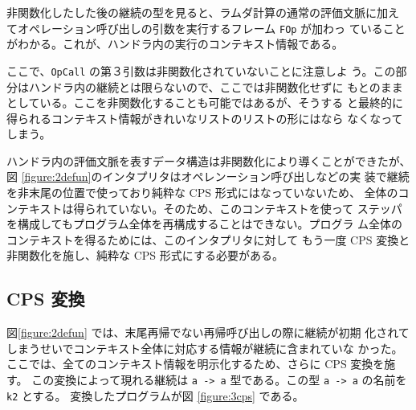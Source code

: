 非関数化したした後の継続の型を見ると、ラムダ計算の通常の評価文脈に加え
てオペレーション呼び出しの引数を実行するフレーム \texttt{FOp} が加わっ
ていることがわかる。これが、ハンドラ内の実行のコンテキスト情報である。

ここで、\texttt{OpCall} の第３引数は非関数化されていないことに注意しよ
う。この部分はハンドラ内の継続とは限らないので、ここでは非関数化せずに
もとのままとしている。ここを非関数化することも可能ではあるが、そうする
と最終的に得られるコンテキスト情報がきれいなリストのリストの形にはなら
なくなってしまう。

ハンドラ内の評価文脈を表すデータ構造は非関数化により導くことができたが、
図 \ref{figure:2defun}のインタプリタはオペレンーション呼び出しなどの実
装で継続を非末尾の位置で使っており純粋な CPS 形式にはなっていないため、
全体のコンテキストは得られていない。そのため、このコンテキストを使って
ステッパを構成してもプログラム全体を再構成することはできない。プログラ
ム全体のコンテキストを得るためには、このインタプリタに対して
もう一度 CPS 変換と非関数化を施し、純粋な CPS 形式にする必要がある。


\subsection{CPS 変換}
\label{subsection:3cps}

図\ref{figure:2defun} では、末尾再帰でない再帰呼び出しの際に継続が初期
化されてしまうせいでコンテキスト全体に対応する情報が継続に含まれていな
かった。
ここでは、全てのコンテキスト情報を明示化するため、さらに CPS 変換を施
す。
この変換によって現れる継続は \texttt{a -> a} 型である。この型
\texttt{a -> a} の名前を \texttt{k2} とする。
変換したプログラムが図 \ref{figure:3cps} である。

